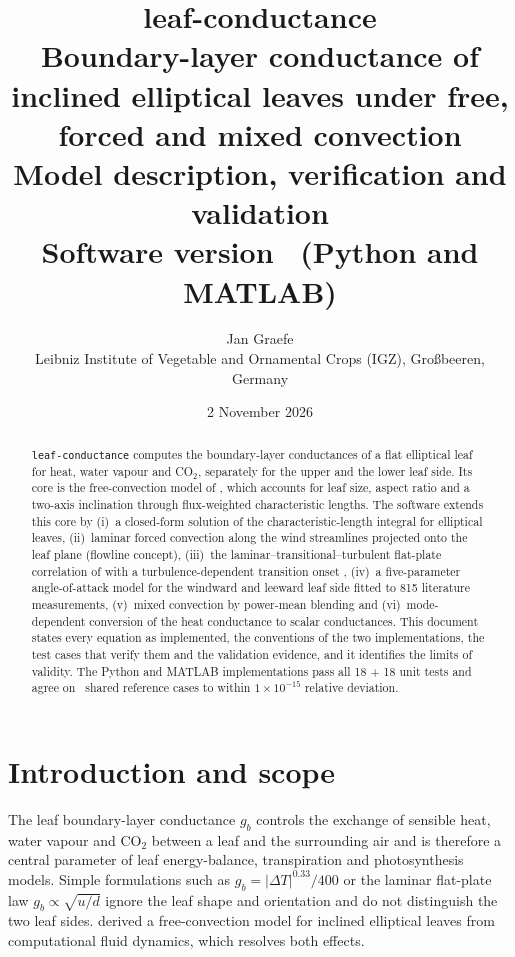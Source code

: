 \documentclass[11pt,a4paper]{article}
\title{\textbf{leaf-conductance}\\[4pt]
\large Boundary-layer conductance of inclined elliptical leaves under free, forced and mixed convection\\[2pt]
\normalsize Model description, verification and validation\\[2pt]
\normalsize Software version \PkgVersion\ (Python and MATLAB)}
\author{Jan Graefe\\ \small Leibniz Institute of Vegetable and Ornamental Crops (IGZ), Gro\ss beeren, Germany}
\date{2 November 2026}
\begin{document}
\maketitle

\begin{abstract}
\noindent \texttt{leaf-conductance} computes the boundary-layer conductances of a flat elliptical leaf for heat, water vapour and CO$_2$, separately for the upper and the lower leaf side. Its core is the free-convection model of \citet{graefe2022}, which accounts for leaf size, aspect ratio and a two-axis inclination through flux-weighted characteristic lengths. The software extends this core by
(i)~a closed-form solution of the characteristic-length integral for elliptical leaves,
(ii)~laminar forced convection along the wind streamlines projected onto the leaf plane (flowline concept),
(iii)~the laminar--transitional--turbulent flat-plate correlation of \citet{lienhard2020} with a turbulence-dependent transition onset \citep{mayle1991},
(iv)~a five-parameter angle-of-attack model for the windward and leeward leaf side fitted to 815 literature measurements,
(v)~mixed convection by power-mean blending and
(vi)~mode-dependent conversion of the heat conductance to scalar conductances.
This document states every equation as implemented, the conventions of the two implementations, the test cases that verify them and the validation evidence, and it identifies the limits of validity. The Python and MATLAB implementations pass all 18 + 18 unit tests and agree on \NRefTotal\ shared reference cases to within $\ensuremath{1\times10^{-15}}$ relative deviation.
\end{abstract}

\tableofcontents
\newpage

\section{Introduction and scope}
The leaf boundary-layer conductance $g_b$ controls the exchange of sensible heat, water vapour and CO$_2$ between a leaf and the surrounding air and is therefore a central parameter of leaf energy-balance, transpiration and photosynthesis models. Simple formulations such as $g_b = |\Delta T|^{0.33}/400$ \citep{monteith1973} or the laminar flat-plate law $g_b \propto \sqrt{u/d}$ \citep{campbell1998} ignore the leaf shape and orientation and do not distinguish the two leaf sides. \citet{graefe2022} derived a free-convection model for inclined elliptical leaves from computational fluid dynamics, which resolves both effects.
\end{document}
